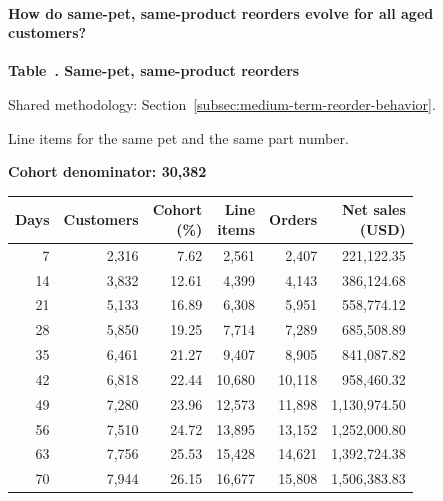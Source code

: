 \paragraph{How do same-pet, same-product reorders evolve for all aged customers?}

\label{tab:financial-opportunity-reorder-windows}
\par\smallskip\noindent\parbox[t][2\baselineskip][t]{\linewidth}{\raggedright\textbf{Table~\thetable. Same-pet, same-product reorders}}
\par\raggedright\footnotesize Shared methodology: Section~\ref{subsec:medium-term-reorder-behavior}.
\par\noindent\parbox[t][2\baselineskip][t]{\linewidth}{\raggedright Line items for the same pet and the same part number.}
\par\noindent\textbf{Cohort denominator: 30,382}
\par\centering\footnotesize
\setlength{\tabcolsep}{2pt}
\begin{tabular}{rrrrrr}\toprule
Days & Customers & \shortstack{Cohort\\(\%)} & \shortstack{Line\\items} & Orders & \shortstack{Net sales\\(USD)} \\ \midrule
7 & 2,316 & 7.62 & 2,561 & 2,407 & 221,122.35 \\
14 & 3,832 & 12.61 & 4,399 & 4,143 & 386,124.68 \\
21 & 5,133 & 16.89 & 6,308 & 5,951 & 558,774.12 \\
28 & 5,850 & 19.25 & 7,714 & 7,289 & 685,508.89 \\
35 & 6,461 & 21.27 & 9,407 & 8,905 & 841,087.82 \\
42 & 6,818 & 22.44 & 10,680 & 10,118 & 958,460.32 \\
49 & 7,280 & 23.96 & 12,573 & 11,898 & 1,130,974.50 \\
56 & 7,510 & 24.72 & 13,895 & 13,152 & 1,252,000.80 \\
63 & 7,756 & 25.53 & 15,428 & 14,621 & 1,392,724.38 \\
70 & 7,944 & 26.15 & 16,677 & 15,808 & 1,506,383.83 \\
\bottomrule\end{tabular}\par

